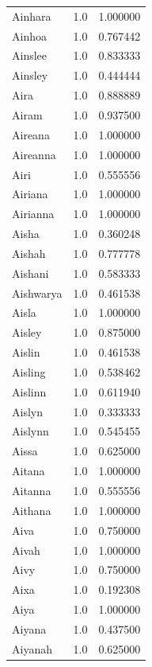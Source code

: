\documentclass[
  letterpaper,
  DIV=11,
  numbers=noendperiod]{scrreprt}
\begin{document}
\begin{tabular}{lrr}
Ainhara         &   1.0 &   1.000000 \\
Ainhoa          &   1.0 &   0.767442 \\
Ainslee         &   1.0 &   0.833333 \\
Ainsley         &   1.0 &   0.444444 \\
Aira            &   1.0 &   0.888889 \\
Airam           &   1.0 &   0.937500 \\
Aireana         &   1.0 &   1.000000 \\
Aireanna        &   1.0 &   1.000000 \\
Airi            &   1.0 &   0.555556 \\
Airiana         &   1.0 &   1.000000 \\
Airianna        &   1.0 &   1.000000 \\
Aisha           &   1.0 &   0.360248 \\
Aishah          &   1.0 &   0.777778 \\
Aishani         &   1.0 &   0.583333 \\
Aishwarya       &   1.0 &   0.461538 \\
Aisla           &   1.0 &   1.000000 \\
Aisley          &   1.0 &   0.875000 \\
Aislin          &   1.0 &   0.461538 \\
Aisling         &   1.0 &   0.538462 \\
Aislinn         &   1.0 &   0.611940 \\
Aislyn          &   1.0 &   0.333333 \\
Aislynn         &   1.0 &   0.545455 \\
Aissa           &   1.0 &   0.625000 \\
Aitana          &   1.0 &   1.000000 \\
Aitanna         &   1.0 &   0.555556 \\
Aithana         &   1.0 &   1.000000 \\
Aiva            &   1.0 &   0.750000 \\
Aivah           &   1.0 &   1.000000 \\
Aivy            &   1.0 &   0.750000 \\
Aixa            &   1.0 &   0.192308 \\
Aiya            &   1.0 &   1.000000 \\
Aiyana          &   1.0 &   0.437500 \\
Aiyanah         &   1.0 &   0.625000 \\

\end{tabular}
\end{document}
